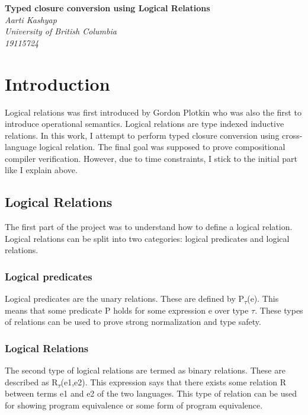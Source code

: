 \documentclass[10pt]{article}
\begin{document}
\begin{titlepage}
	\begin{center}
		\Large\textbf{Typed closure conversion using Logical Relations}\\
		\bigbreak
		\large\textit{Aarti Kashyap} \\
		\large\textit{University of British Columbia}\\
			\large\textit{19115724}
		
	\end{center}
\end{titlepage}

\tableofcontents
\newpage

\section{Introduction} 
Logical relations was first introduced by Gordon Plotkin who was also the first to introduce operational semantics. Logical relations are type indexed inductive relations. In this work, I attempt to perform typed closure conversion using cross-language logical relation. The final goal was supposed to prove compositional compiler verification. However, due to time constraints, I stick to the initial part like I explain above. 


\subsection{Logical Relations}
The first part of the project was to understand how to define a logical relation. Logical relations can be split into two categories: logical predicates and logical relations.
\subsubsection{Logical predicates}
 Logical predicates are the unary relations. These are defined by      P\textsubscript{$\tau$}(e). This means that some predicate P holds for some expression e over type $\tau$. These types of relations can be used to prove strong normalization and type safety.
 \subsubsection{Logical Relations}
 The second type of logical relations are termed as binary relations. These are described as R\textsubscript{$\tau$}(e1,e2). This expression says that there exists some relation R between terms e1 and e2 of the two languages. This type of relation can be used for showing program equivalence or some form of program equivalence. 
 
\end{document}
